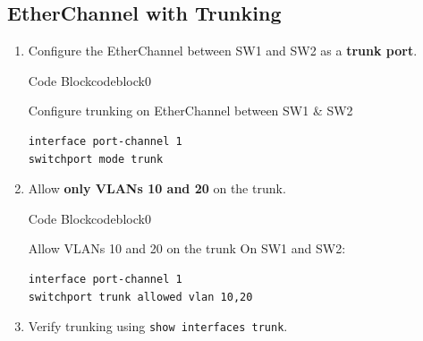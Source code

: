 \documentclass[a4paper]{article}
\begin{document}
\subsection{EtherChannel with Trunking}
\begin{enumerate}
	\item Configure the EtherChannel between SW1 and SW2 as a \textbf{trunk port}.


	      \begin{ocg}{Code Block}{codeblock}{0}

		      \vspace{0.5cm}
		      Configure trunking on EtherChannel between SW1 \& SW2
		      \begin{lstlisting}
interface port-channel 1
switchport mode trunk
\end{lstlisting}

		      \vspace{0.5cm}
	      \end{ocg}





	\item Allow \textbf{only VLANs 10 and 20} on the trunk.


	      \begin{ocg}{Code Block}{codeblock}{0}

		      \vspace{0.5cm}
		      Allow VLANs 10 and 20 on the trunk On SW1 and SW2:
		      \begin{lstlisting}
interface port-channel 1
switchport trunk allowed vlan 10,20
    \end{lstlisting}

		      \vspace{0.5cm}
	      \end{ocg}



	\item Verify trunking using \texttt{show interfaces trunk}.
\end{enumerate}
\end{document}
